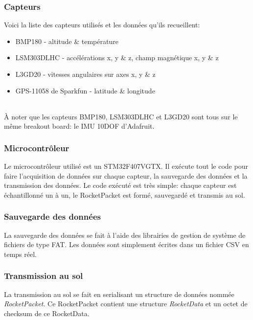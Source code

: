\subsubsection{Capteurs}

Voici la liste des capteurs utilisés et les données qu'ils recueillent:
~\\

\begin{itemize}
	\item BMP180 - altitude \& température
	\item LSM303DLHC - accélérations x, y \& z, champ magnétique x, y \& z
	\item L3GD20 - vitesses angulaires sur axes x, y \& z
	\item GPS-11058 de Sparkfun - latitude \& longitude
\end{itemize}

~\\
À noter que les capteurs BMP180, LSM303DLHC et L3GD20 sont tous sur le même
breakout board: le IMU 10DOF d'Adafruit.

\subsubsection{Microcontrôleur}

Le microcontrôleur utilisé est un STM32F407VGTX. Il exécute tout le code pour
faire l'acquisition de données sur chaque capteur, la sauvegarde des données et
la transmission des données. Le code exécuté est très simple: chaque capteur
est échantillonné un à un, le RocketPacket est formé, sauvegardé et transmis au
sol.

\subsubsection{Sauvegarde des données}

La sauvegarde des données se fait à l'aide des librairies de gestion de système
de fichiers de type FAT. Les données sont simplement écrites dans un fichier
CSV en temps réel.

\subsubsection{Transmission au sol}

La transmission au sol se fait en serialisant un structure de données nommée
\textit{RocketPacket}. Ce RocketPacket contient une structure
\textit{RocketData} et un octet de checksum de ce RocketData.

